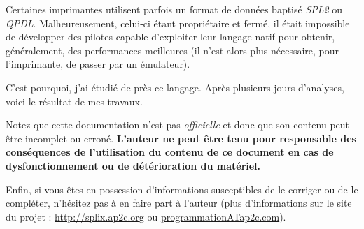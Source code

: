 Certaines imprimantes utilisent parfois un format de données baptisé 
\emph{SPL2} ou \emph{QPDL}. Malheureusement, celui-ci étant propriétaire et 
fermé, il était impossible de développer des pilotes capable d'exploiter
leur langage natif pour obtenir, généralement, des performances meilleures
(il n'est alors plus nécessaire, pour l'imprimante, de passer par un 
émulateur). 

C'est pourquoi, j'ai étudié de près ce langage. Après plusieurs jours 
d'analyses, voici le résultat de mes travaux.
\medskip

Notez que cette documentation n'est pas \emph{officielle} et donc que 
son contenu peut être incomplet ou erroné. \textbf{L'auteur ne peut être 
tenu pour responsable des conséquences de l'utilisation du contenu de ce 
document en cas de dysfonctionnement ou de détérioration du matériel.}
\medskip

Enfin, si vous êtes en possession d'informations susceptibles de le corriger
ou de le compléter, n'hésitez pas à en faire part à l'auteur (plus
d'informations sur le site du projet : \url{http://splix.ap2c.org} ou
\url{programmationATap2c.com}).
